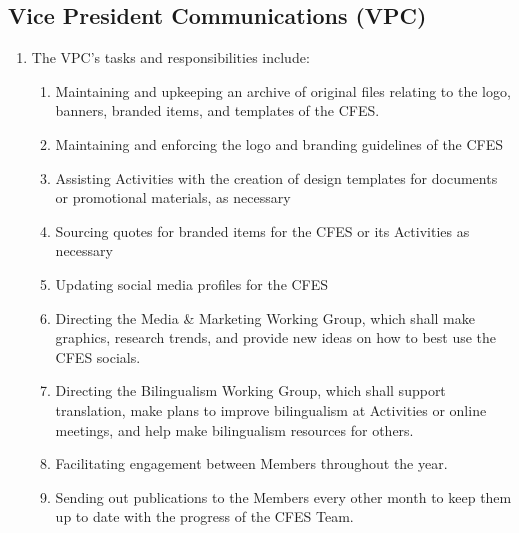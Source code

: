 \subsection{Vice President Communications (VPC)}
\label{national-executive-vice-president-communications-vpc}

\begin{enumerate}
 \item The VPC’s tasks and responsibilities include:
  \begin{enumerate}
   \item Maintaining and upkeeping an archive of original files relating to the logo, banners, branded items, and templates of the CFES.
   \item Maintaining and enforcing the logo and branding guidelines of the CFES
   \item Assisting Activities with the creation of design templates for documents or promotional materials, as necessary
   \item Sourcing quotes for branded items for the CFES or its Activities as necessary
   \item Updating social media profiles for the CFES
   \item Directing the Media \& Marketing Working Group, which shall make graphics, research trends, and provide new ideas on how to best use the CFES socials.
   \item Directing the Bilingualism Working Group, which shall support translation, make plans to improve bilingualism at Activities or online meetings, and help make bilingualism resources for others.
   \item Facilitating engagement between Members throughout the year.
   \item Sending out publications to the Members every other month to keep them up to date with the progress of the CFES Team.
  \end{enumerate}
\end{enumerate}
